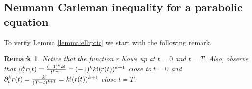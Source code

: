 \documentclass[10pt]{article}
\newtheorem{rmq}{Remark}
\begin{document}

\begin{appendix}
%
%
%



\section{Neumann Carleman inequality for a parabolic equation}\label{App:mov_lapla}

	To verify Lemma \ref{lemma:elliptic} we start with the following remark.
\begin{rmq}\label{rmk:g}
	Notice that the function $r$ blows up at $t=0$ and $t=T$.
	Also, observe that $\partial^k_tr(t)={(-1)^k k!\over t^{k+1}}=(-1)^k k!(r(t))^{k+1}$ close to $t=0$ and
	$\partial^k_tr(t)={k!\over (T-t)^{k+1}}=k!(r(t))^{k+1}$ close $t=T$.
\end{rmq}


\end{appendix}
\end{document}
